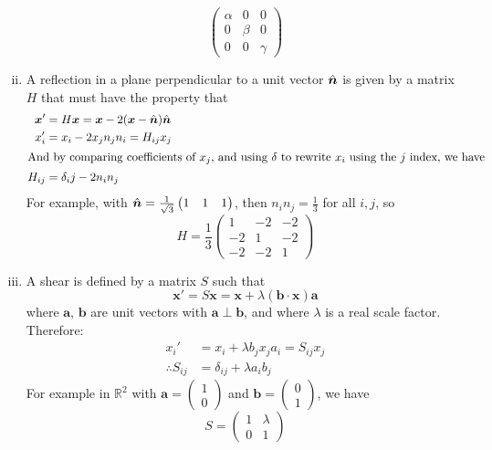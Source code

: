 \documentclass{article}
\begin{document}
\begin{enumerate}[(i)]
	      \[ \begin{pmatrix}
			      \alpha & 0     & 0      \\
			      0      & \beta & 0      \\
			      0      & 0     & \gamma
		      \end{pmatrix} \]
	\item A reflection in a plane perpendicular to a unit vector $\hat{\bm n}$ is given by a matrix $H$ that must have the property that
	      \begin{align*}
		      \bm x' & = H \bm x = \bm x - 2(\bm x - \hat{\bm n}) \hat{\bm n} \\
		      x_i'   & = x_i - 2x_jn_jn_i = H_{ij}x_j             \\
		      \intertext{And by comparing coefficients of $x_j$, and using $\delta$ to rewrite $x_i$ using the $j$ index, we have}
		      H_{ij} & = \delta_ij - 2n_in_j
	      \end{align*}
	      For example, with $\hat{\bm n} = \frac{1}{\sqrt 3}\begin{pmatrix}
			      1 & 1 & 1
		      \end{pmatrix}$, then $n_in_j = \frac{1}{3}$ for all $i, j$, so
	      \[ H = \frac{1}{3}\begin{pmatrix}
			      1  & -2 & -2 \\
			      -2 & 1  & -2 \\
			      -2 & -2 & 1
		      \end{pmatrix} \]
	\item A shear is defined by a matrix $S$ such that
	      \[ \bm x' = S\bm x = \bm x + \lambda(\bm b \cdot \bm x)\bm a \]
	      where $\bm a$, $\bm b$ are unit vectors with $\bm a \perp \bm b$, and where $\lambda$ is a real scale factor. Therefore:
	      \begin{align*}
		      x_i'              & = x_i + \lambda b_j x_j a_i = S_{ij}x_j \\
		      \therefore S_{ij} & = \delta_{ij} + \lambda a_i b_j
	      \end{align*}
	      For example in $\mathbb R^2$ with $\bm a = \begin{pmatrix}
			      1 \\ 0
		      \end{pmatrix}$ and $\bm b = \begin{pmatrix}
			      0 \\ 1
		      \end{pmatrix}$, we have
	      \[ S = \begin{pmatrix}
			      1 & \lambda \\ 0 & 1

\end{pmatrix}\]
\end{enumerate}
\end{document}
